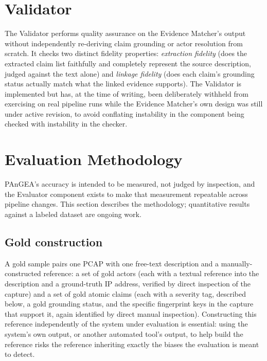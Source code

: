 \documentclass[sigconf,nonacm]{acmart}
\begin{document}
\section{Validator}
\label{sec:validator}

The Validator performs quality assurance on the Evidence Matcher's output
without independently re-deriving claim grounding or actor resolution from
scratch. It checks two distinct fidelity properties: \emph{extraction
fidelity} (does the extracted claim list faithfully and completely represent
the source description, judged against the text alone) and \emph{linkage
fidelity} (does each claim's grounding status actually match what the linked
evidence supports). The Validator is implemented but has, at the time of
writing, been deliberately withheld from exercising on real pipeline runs
while the Evidence Matcher's own design was still under active revision, to
avoid conflating instability in the component being checked with instability
in the checker.

\section{Evaluation Methodology}
\label{sec:evaluation-methodology}

PAnGEA's accuracy is intended to be measured, not judged by inspection, and
the Evaluator component exists to make that measurement repeatable across
pipeline changes. This section describes the methodology; quantitative results
against a labeled dataset are ongoing work.

\subsection{Gold construction}

A gold sample pairs one PCAP with one free-text description and a
manually-constructed reference: a set of gold actors (each with a
textual reference into the description and a ground-truth IP address,
verified by direct inspection of the capture) and a set of gold atomic
claims (each with a severity tag, described below, a gold grounding status,
and the specific fingerprint keys in the capture that support it, again
identified by direct manual inspection). Constructing this reference
independently of the system under evaluation is essential: using the
system's own output, or another automated tool's output, to help build the
reference risks the reference inheriting exactly the biases the evaluation
is meant to detect.
\end{document}
